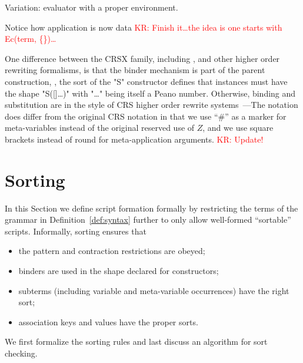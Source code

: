 \documentclass[letterpaper,11pt]{article}
\newcommand{\KR}[1]{\textcolor{red}{KR: #1}}
\begin{document}
\begin{example}
  Variation: evaluator with a proper environment. 
  Notice how application is now data
  \KR{Finish it…the idea is one starts with Ec(term, \{\})…}
\end{example}

\begin{remark}
  One difference between the CRSX family, including \hax, and other higher order rewriting
  formalisms, is that the binder mechanism is part of the parent construction, \eg, the sort of the
  "S" constructor defines that instances must have the shape "S([]…)" with "…" being itself a Peano
  number.  Otherwise, binding and substitution are in the style of CRS higher order rewrite
  systems~\cite{Klop+:tcs1993}---The notation does differ from the original CRS notation in that we
  use ``\#'' as a marker for meta-variables instead of the original reserved use of $Z$, and we use
  square brackets instead of round for meta-application arguments. \KR{Update!}
\end{remark}



\section{Sorting}
\label{sec:sorting}

In this Section we define \hax script formation formally by restricting the terms of the grammar in
Definition~\ref{def:syntax} further to only allow well-formed ``sortable'' scripts. Informally,
sorting ensures that
\begin{itemize}
\item the pattern and contraction restrictions are obeyed;
\item binders are used in the shape declared for constructors;
\item subterms (including variable and meta-variable occurrences) have the right sort;
\item association keys and values have the proper sorts.
\end{itemize}
We first formalize the sorting rules and last discuss an algorithm for sort checking.
\end{document}
